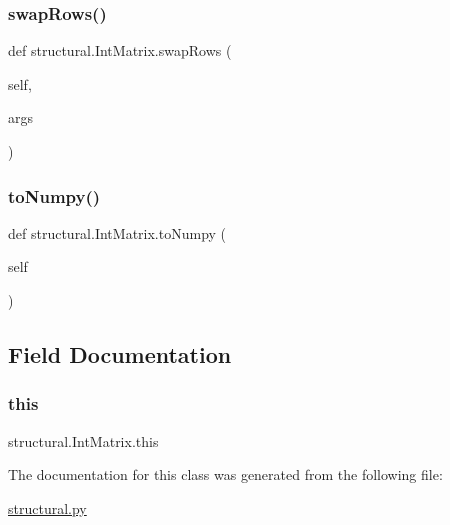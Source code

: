 \subsubsection{\texorpdfstring{swap\+Rows()}{swapRows()}}
{\footnotesize\ttfamily def structural.\+Int\+Matrix.\+swap\+Rows (\begin{DoxyParamCaption}\item[{}]{self,  }\item[{}]{args }\end{DoxyParamCaption})}

\mbox{\label{classstructural_1_1_int_matrix_a71e05123364f76b39b1910b76ab0dd51}} 
\subsubsection{\texorpdfstring{to\+Numpy()}{toNumpy()}}
{\footnotesize\ttfamily def structural.\+Int\+Matrix.\+to\+Numpy (\begin{DoxyParamCaption}\item[{}]{self }\end{DoxyParamCaption})}



\subsection{Field Documentation}
\mbox{\label{classstructural_1_1_int_matrix_a522d656248c2c15fc7ff9f46e994bdad}} 
\subsubsection{\texorpdfstring{this}{this}}
{\footnotesize\ttfamily structural.\+Int\+Matrix.\+this}



The documentation for this class was generated from the following file\+:\begin{DoxyCompactItemize}
\item 
\hyperlink{structural_8py}{structural.\+py}\end{DoxyCompactItemize}
